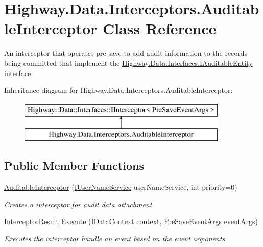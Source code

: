 \hypertarget{class_highway_1_1_data_1_1_interceptors_1_1_auditable_interceptor}{\section{Highway.\-Data.\-Interceptors.\-Auditable\-Interceptor Class Reference}
\label{class_highway_1_1_data_1_1_interceptors_1_1_auditable_interceptor}
}


An interceptor that operates pre-\/save to add audit information to the records being committed that implement the \hyperlink{interface_highway_1_1_data_1_1_interfaces_1_1_i_auditable_entity}{Highway.\-Data.\-Interfaces.\-I\-Auditable\-Entity} interface  


Inheritance diagram for Highway.\-Data.\-Interceptors.\-Auditable\-Interceptor\-:\begin{figure}[H]
\begin{center}
\leavevmode
\includegraphics[height=2.000000cm]{class_highway_1_1_data_1_1_interceptors_1_1_auditable_interceptor}
\end{center}
\end{figure}
\subsection*{Public Member Functions}
\begin{DoxyCompactItemize}
\item 
\hyperlink{class_highway_1_1_data_1_1_interceptors_1_1_auditable_interceptor_ae12de3cb75bc62d39bd2b8aeff796844}{Auditable\-Interceptor} (\hyperlink{interface_highway_1_1_data_1_1_interfaces_1_1_i_user_name_service}{I\-User\-Name\-Service} user\-Name\-Service, int priority=0)
\begin{DoxyCompactList}\small\item\em Creates a interceptor for audit data attachment \end{DoxyCompactList}\item 
\hyperlink{struct_highway_1_1_data_1_1_interceptors_1_1_interceptor_result}{Interceptor\-Result} \hyperlink{class_highway_1_1_data_1_1_interceptors_1_1_auditable_interceptor_acc6803b69df915b7df03bc3f0981ba40}{Execute} (\hyperlink{interface_highway_1_1_data_1_1_interfaces_1_1_i_data_context}{I\-Data\-Context} context, \hyperlink{class_highway_1_1_data_1_1_interceptors_1_1_events_1_1_pre_save_event_args}{Pre\-Save\-Event\-Args} event\-Args)
\begin{DoxyCompactList}\small\item\em Executes the interceptor handle an event based on the event arguments \end{DoxyCompactList}\end{DoxyCompactItemize}

